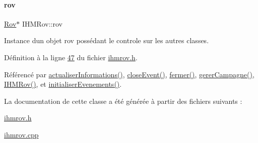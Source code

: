 \mbox{\label{class_i_h_m_rov_a777ca33fdb295ba6b6773e880356fa1e}} 
\paragraph{\texorpdfstring{rov}{rov}}
{\footnotesize\ttfamily \hyperlink{class_rov}{Rov}$\ast$ I\+H\+M\+Rov\+::rov\hspace{0.3cm}{\ttfamily [private]}}



Instance d\textquotesingle{}un objet rov possédant le controle sur les autres classes. 



Définition à la ligne \hyperlink{ihmrov_8h_source_l00047}{47} du fichier \hyperlink{ihmrov_8h_source}{ihmrov.\+h}.



Référencé par \hyperlink{ihmrov_8cpp_source_l00110}{actualiser\+Informations()}, \hyperlink{ihmrov_8cpp_source_l00239}{close\+Event()}, \hyperlink{ihmrov_8cpp_source_l00253}{fermer()}, \hyperlink{ihmrov_8cpp_source_l00202}{gerer\+Campagne()}, \hyperlink{ihmrov_8cpp_source_l00015}{I\+H\+M\+Rov()}, et \hyperlink{ihmrov_8cpp_source_l00098}{initialiser\+Evenements()}.



La documentation de cette classe a été générée à partir des fichiers suivants \+:\begin{DoxyCompactItemize}
\item 
\hyperlink{ihmrov_8h}{ihmrov.\+h}\item 
\hyperlink{ihmrov_8cpp}{ihmrov.\+cpp}\end{DoxyCompactItemize}
